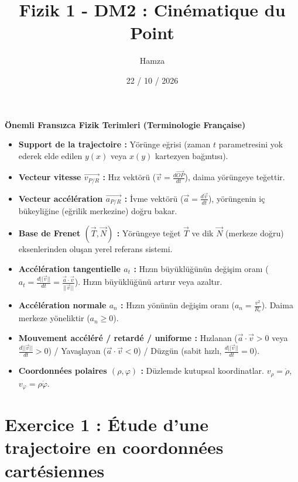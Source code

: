 \documentclass[11pt,a4paper]{article}
\title{\textcolor{myblue}{\textbf{Fizik 1 - DM2 : Cinématique du Point}}}
\author{Hamza}
\date{22 / 10 / 2026}
\begin{document}
\maketitle

\begin{terimbox}{\textbf{Önemli Fransızca Fizik Terimleri (Terminologie Française)}}
\begin{itemize}
    \item \textbf{Support de la trajectoire :} Yörünge eğrisi (zaman $t$ parametresini yok ederek elde edilen $y(x)$ veya $x(y)$ kartezyen bağıntısı).
    \item \textbf{Vecteur vitesse $\vec{v_{P/R}}$ :} Hız vektörü ($\vec{v} = \frac{d\vec{OP}}{dt}$), daima yörüngeye teğettir.
    \item \textbf{Vecteur accélération $\vec{a_{P/R}}$ :} İvme vektörü ($\vec{a} = \frac{d\vec{v}}{dt}$), yörüngenin iç bükeyliğine (eğrilik merkezine) doğru bakar.
    \item \textbf{Base de Frenet $(\vec{T}, \vec{N})$ :} Yörüngeye teğet $\vec{T}$ ve dik $\vec{N}$ (merkeze doğru) eksenlerinden oluşan yerel referans sistemi.
    \item \textbf{Accélération tangentielle $a_t$ :} Hızın büyüklüğünün değişim oranı ($a_t = \frac{d||\vec{v}||}{dt} = \frac{\vec{a}\cdot\vec{v}}{||\vec{v}||}$). Hızın büyüklüğünü artırır veya azaltır.
    \item \textbf{Accélération normale $a_n$ :} Hızın yönünün değişim oranı ($a_n = \frac{v^2}{R_c}$). Daima merkeze yöneliktir ($a_n \ge 0$).
    \item \textbf{Mouvement accéléré / retardé / uniforme :} Hızlanan ($\vec{a}\cdot\vec{v} > 0$ veya $\frac{d||\vec{v}||}{dt} > 0$) / Yavaşlayan ($\vec{a}\cdot\vec{v} < 0$) / Düzgün (sabit hızlı, $\frac{d||\vec{v}||}{dt} = 0$).
    \item \textbf{Coordonnées polaires $(\rho, \varphi)$ :} Düzlemde kutupsal koordinatlar. $v_\rho = \dot{\rho}$, $v_\varphi = \rho\dot{\varphi}$.
\end{itemize}
\end{terimbox}

\vspace{0.5cm}

\section*{Exercice 1 : Étude d'une trajectoire en coordonnées cartésiennes}
\end{document}
